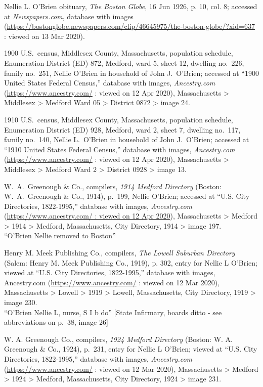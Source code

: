 \begin{thebibliography}{99}
	Nellie L. O’Brien obituary, \textit{The Boston Globe}, 16 Jun 1926, p. 10, col. 8; accessed at \textit{Newspapers.com}, database with images (\url{https://bostonglobe.newspapers.com/clip/46645975/the-boston-globe/?xid=637} : viewed on 13 Mar 2020). 
	
	1900 U.S.\ census, Middlesex County, Massachusetts, population schedule, Enumeration District (ED) 872, Medford, ward 5, sheet 12, dwelling no.\ 226, family no.\ 251, Nellie O'Brien in household of John J.\ O'Brien; accessed at ``1900 United States Federal Census,'' database with images, \textit{Ancestry.com} (\url{https://www.ancestry.com/} : viewed on 12 Apr 2020), Massachusetts > Middlesex > Medford Ward 05 > District 0872 > image 24.
	
	1910 U.S.\ census, Middlesex County, Massachusetts, population schedule, Enumeration District (ED) 928, Medford, ward 2, sheet 7, dwelling no.\ 117, family no.\ 140, Nellie L.\ O'Brien in household of John J.\ O'Brien; accessed at ``1910 United States Federal Census,'' database with images, \textit{Ancestry.com} (\url{https://www.ancestry.com/} : viewed on 12 Apr 2020), Massachusetts > Middlesex > Medford Ward 2 > District 0928 > image 13.
	
	W.\ A.\ Greenough \& Co., compilers, \textit{1914 Medford Directory} (Boston: W.\ A.\ Greenough \& Co., 1914), p.\ 199, Nellie O'Brien; accessed at ``U.S. City Directories, 1822-1995,'' database with images, \textit{Ancestry.com} (\url{https://www.ancestry.com/ : viewed on 12 Apr 2020}), Massachusetts > Medford > 1914 > Medford, Massachusetts, City Directory, 1914 > image 197.\\
	``O'Brien Nellie removed to Boston''
	
	Henry M. Meek Publishing Co., compilers, \textit{The Lowell Suburban Directory} (Salem: Henry M. Meek Publishing Co., 1919), p. 302, entry for Nellie L O'Brien; viewed at ``U.S. City Directories, 1822-1995,'' database with images, Ancestry.com (\url{https://www.ancestry.com/} : viewed on 12 Mar 2020), Massachusetts > Lowell > 1919 > Lowell, Massachusetts, City Directory, 1919 > image 230.\\
	``O'Brien Nellie L, nurse, S I b do'' [State Infirmary, boards ditto - see abbreviations on p.\ 38, image 26]
	
	W. A. Greenough Co., compilers, \textit{1924 Medford Directory} (Boston: W. A. Greenough \& Co., 1924), p.\ 231, entry for Nellie L O'Brien; viewed at ``U.S. City Directories, 1822-1995,'' database with images, \textit{Ancestry.com} (\url{https://www.ancestry.com/} : viewed on 12 Mar 2020), Massachusetts > Medford > 1924 > Medford, Massachusetts, City Directory, 1924 > image 231.
	

\end{thebibliography}
